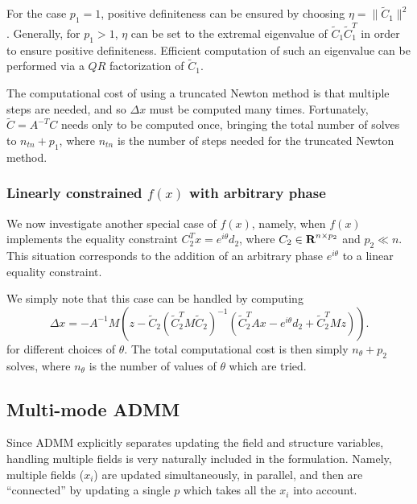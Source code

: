 \documentclass{article}
\newcommand{\tC}{\tilde{C}}
\begin{document}
For the case $p_1 = 1$, positive definiteness can be ensured by choosing
    $\eta = \| \tC_1 \|^2$.
Generally, for $p_1 > 1$, $\eta$ can be set to the extremal eigenvalue of
    $\tC_1 \tC_1^T$ in order to ensure positive definiteness.
Efficient computation of such an eigenvalue can be performed
    via a $QR$ factorization of $\tC_1$.

The computational cost of using a truncated Newton method is that 
    multiple steps are needed, and so $\Delta x$ must be computed many times.
Fortunately, $\tC = A^{-T} C$ needs only to be computed once,
    bringing the total number of solves to $n_{tn} + p_1$, 
    where $n_{tn}$ is the number of steps needed 
    for the truncated Newton method.

\subsubsection{Linearly constrained $f(x)$ with arbitrary phase}
We now investigate another special case of $f(x)$, 
    namely, when $f(x)$ implements the equality constraint 
    $C_2^T x = e^{i \theta}d_2$,
    where $C_2 \in {\mbox{\bf R}}^{n \times p_2}$ and $p_2 \ll n$.
This situation corresponds to
    the addition of an arbitrary phase $e^{i\theta}$
    to a linear equality constraint.
    
We simply note that this case can be handled by computing
    \begin{equation}
    \Delta x = -A^{-1} M (z - 
        \tC_2 (\tC_2^T M \tC_2)^{-1}(\tC_2^T Ax - e^{i\theta}d_2 + \tC_2^T Mz)).
    \end{equation}
    for different choices of $\theta$.
The total computational cost is then simply $n_\theta + p_2$ solves,
    where $n_\theta$ is the number of values of $\theta$ which are tried.

\subsection{Multi-mode ADMM}
Since ADMM explicitly separates updating the field and structure variables,
    handling multiple fields is very naturally included in the formulation.
Namely, multiple fields ($x_i$) are updated simultaneously, in parallel,
    and then are ``connected'' by updating a single $p$ 
    which takes all the $x_i$ into account.
\end{document}
